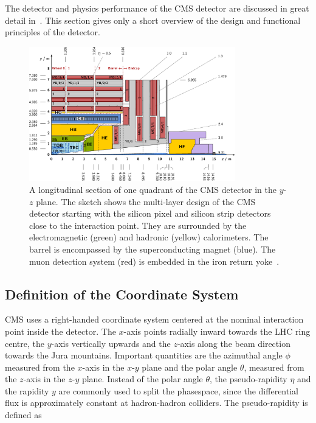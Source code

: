 The detector and physics performance of the CMS detector are discussed in
great detail in~\cite{Bayatian:922757,Ball:2007zza}. This section gives only a
short overview of the design and functional principles of the detector.

\begin{figure}[htp]
    \centering
    \includegraphics[width=0.8\textwidth]{figures/cms_detector/cms_longitudinal_section.pdf}
    \caption[Longitudinal section of the CMS
    detector]{A longitudinal section of one quadrant of the CMS
        detector in the $y$-$z$ plane. The sketch shows
    the multi-layer design of the CMS detector starting with the silicon pixel
and silicon strip detectors close to the interaction point. They are surrounded
by the electromagnetic (green) and hadronic (yellow) calorimeters. The barrel is
encompassed by the superconducting magnet (blue). The muon detection system
(red) is embedded in the iron return yoke~\cite{Berger:2014aca}.}
    \label{fig:cms:longitudinal_section}
\end{figure}

\subsection{Definition of the Coordinate System}

CMS uses a right-handed coordinate system centered at the nominal interaction point inside the
detector. The $x$-axis points radially inward towards the LHC ring centre, the
$y$-axis vertically upwards and the $z$-axis along the beam direction towards
the Jura mountains. Important quantities are the azimuthal angle $\phi$
measured from the $x$-axis in the $x$-$y$ plane and the polar angle $\theta$,
measured from the $z$-axis in the $z$-$y$ plane. Instead of the polar angle
$\theta$, the pseudo-rapidity $\eta$ and the rapidity $y$ are commonly used to
split the phasespace, since the differential flux is approximately constant at
hadron-hadron colliders. The pseudo-rapidity is defined as


